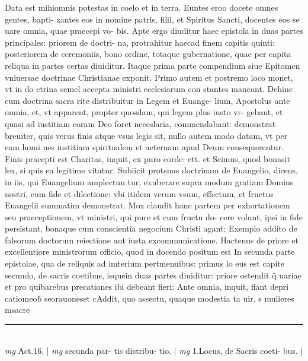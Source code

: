 \documentclass{article}
\begin{document}
\begin{pages}
Data est mihiomnis potestas in coelo et in terra. Euntes eroo docete omnes gentes, bapti-   zantes eos in nomine patris, filii, et Spiritus Sancti, docentes eos se uare omnia, quae praecepi vo- bis. Apte ergo diuditur haec epistola in duas partes principales: priorem de doctri- na, protrahitur haecad finem capitis quinti: posteriorem de ceremoniis, bono ordine, totaque  gubernatione, quae per capita reliqua in partes certas diuiditur. Itaque  prima parte compendium siue Epitomen vniuersae doctrinae Christianae exponit. Primo autem et postremo loco monet, vt in do ctrina semel accepta ministri ecclesiarum con stantes mancant. Dehinc cum doctrina sacra rite distribuitur in Legem et Euange- lium, Apostolus ante omnia, et, vt apparent, propter quosdam, qui legem plus iusto vr- gebant, et quasi ad iustitiam coram Deo foret neceslaria, commendabant: demonstrat breuiter, quis verus finis atque  vsus legis sit, nullo autem modo datam, vt per eam homi nes iustitiam spiritualem et aeternam apud Deum consequerentur. Finis pracepti est Charitas, inquit, ex puro corde: ett. et Scimus, quod bonasit lex, si quis ea legitime vitatur. Subiicit protsnus doctrinam de Euangelio, dicens, in iis, qui Euangelium amplectun tur, exuberare supra modum gratiam Domins nostri, cum fide et dilectione: vbi itidem verum vsum, effectum, et fructus Euangelii summatim demonstrat. Mox claudit hanc partem per exhortationem seu praeceptionem, vt ministri, qui pure et cum fructu do- cere volunt, ipsi in fide persistant, bonaque  cum conscientia negocium Christi agant: Exemplo addito de falsorum doctorum reiectione aut iusta excommunicatione.  \pend\pstart Hactenus de priore et excellentiore ministrorum officio, quod in docendo positum est In secunda parte epistolae, qua de reliquis ad imterium pertmenuibus: primus lo eus est capite secundo, de sacris coetibus, isquein duas partes diuiditur: priore ostendit q̃ uariae et pro quibarebus precationes ibi debeant fieri: Ante omnia, inquit, fiant depri catiomeob́ seorauoneset cAddit, quo assectu, quaque  modestia ta uir, s mulieres msacre  \pend
\vspace{0.5cm}\noindent
\vspace{0.2cm}\rule{1cm}{0.2pt}\\ 
\hspace{0.2cm}\textit{mg}
\footnotesize Act.16. 
\normalsize| 
\hspace{0.2cm}\textit{mg}
\footnotesize secunda par- tis distribu- tio. 
\normalsize| 
\hspace{0.2cm}\textit{mg}
\footnotesize 1.Locus, de Sacris coeti- bus. 
\normalsize| 

\end{pages}
\end{document}
